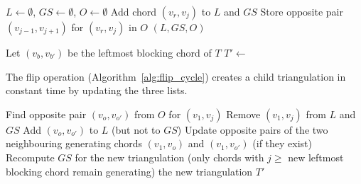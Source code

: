 \begin{algorithm}[htbp]
    \caption{BuildRootTriangulation}
    \label{alg:build_root}
    \begin{algorithmic}[1]
            \State $L \gets \emptyset$, $GS \gets \emptyset$, $O \gets \emptyset$
                \State Add chord $(v_r, v_j)$ to $L$ and $GS$
                \State Store opposite pair $(v_{j-1}, v_{j+1})$ for $(v_r, v_j)$ in $O$
            \EndFor
            \State \Return $(L, GS, O)$
        \EndProcedure
    \end{algorithmic}
\end{algorithm}

\begin{algorithm}[htbp]
    \caption{DFS (Depth-first traversal of \(\mathcal{T}(C)\))}
    \label{alg:dfs_cycle}
    \begin{algorithmic}[1]
            \State Let $(v_b, v_{b'})$ be the leftmost blocking chord of $T$ 
                \State $T' \gets$ 
                \State {}
                \State {}
            \EndFor
        \EndProcedure
    \end{algorithmic}
\end{algorithm}

The flip operation (Algorithm~\ref{alg:flip_cycle}) creates a child triangulation in constant time by updating the three lists.

\begin{algorithm}[htbp]
    \caption{Flip}
    \label{alg:flip_cycle}
    \begin{algorithmic}[1]
            \State Find opposite pair $(v_o, v_{o'})$ from $O$ for $(v_1, v_j)$
            \State Remove $(v_1, v_j)$ from $L$ and $GS$
            \State Add $(v_o, v_{o'})$ to $L$ (but not to $GS$)
            \State Update opposite pairs of the two neighbouring generating chords $(v_1, v_{o})$ and $(v_1, v_{o'})$ (if they exist)
            \State Recompute $GS$ for the new triangulation (only chords with $j \ge$ new leftmost blocking chord remain generating)
            \State \Return the new triangulation $T'$
        \EndProcedure
    \end{algorithmic}
\end{algorithm}

